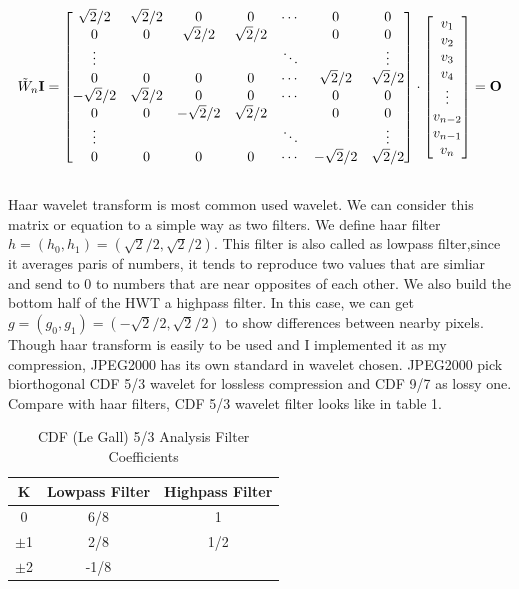 \documentclass[UTF8, letterpaper, 14pt]{article}
\begin{document}
\[\tilde{W}_n \bf{I} = \left[
\begin{matrix}
 \sqrt{2}/2 & \sqrt{2}/2 & 0 & 0 & \cdots & 0 & 0 \\
0 & 0 & \sqrt{2}/2 & \sqrt{2}/2 & & 0 & 0 \\
\vdots & & & & \ddots & & \vdots \\
0 & 0 & 0 & 0 & \cdots & \sqrt{2}/2 & \sqrt{2}/2 \\
-\sqrt{2}/2 & \sqrt{2}/2 & 0 & 0 & \cdots & 0 & 0 \\
0 & 0 & -\sqrt{2}/2 & \sqrt{2}/2 & & 0 & 0 \\
\vdots & & & & \ddots & & \vdots \\
0 & 0 & 0 & 0 & \cdots & -\sqrt{2}/2 & \sqrt{2}/2
 \end{matrix} 
 \right] 
 \cdot 
 \left[ 
 \begin{matrix} 
 v_1 \\ 
 v_2 \\ 
 v_3 \\ 
 v_4 \\ 
 \vdots \\ 
 v_{n-2} \\ 
 v_{n-1} \\ 
 v_n
 \end{matrix}
 \right] = \bf{O}\]
 \\
Haar wavelet transform is most common used wavelet. We can consider this matrix or equation to a simple way as two filters. We define haar filter $h=(h_0, h_1) = (\sqrt{2}/2, \sqrt{2}/2)$. This filter is also called as lowpass filter,since it averages paris of numbers, it tends to reproduce two values that are simliar and send to 0 to numbers that are near opposites of each other. We also build the bottom half of the HWT a highpass filter. In this case, we can get $g=(g_0, g_1) = (-\sqrt{2}/2, \sqrt{2}/2)$ to show differences between nearby pixels.\cite{hwtmath}\\
Though haar transform is easily to be used and I implemented it as my compression, JPEG2000 has its own standard in wavelet chosen. JPEG2000 pick biorthogonal CDF 5/3 wavelet for lossless compression and CDF 9/7 as lossy one. Compare with haar filters, CDF 5/3 wavelet filter looks like in table 1.
\begin{table}[htbp]
\centering
\caption {CDF (Le Gall) 5/3 Analysis Filter Coefficients \cite{jpeg2koverview}} \label{tab:title} 
\begin{tabular}{ccc}
	\hline
	K & Lowpass Filter & Highpass Filter\\
	\hline
	0 & 6/8 & 1 \\
	\hline
	$\pm$1 & 2/8 & 1/2 \\
	\hline
	$\pm$2 & -1/8 & \\
	\hline
\end{tabular} 
\end{table}
\end{document}

